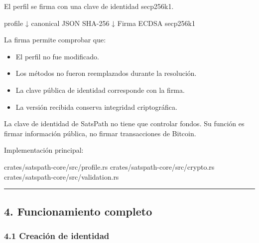 \documentclass[
]{article}
\newenvironment{Shaded}{}{}
\newcommand{\NormalTok}[1]{#1}
\providecommand{\tightlist}{%
  \setlength{\itemsep}{0pt}\setlength{\parskip}{0pt}}
\begin{document}
El perfil se firma con una clave de identidad secp256k1.

\begin{Shaded}
\begin{Highlighting}[]
\NormalTok{profile}
\NormalTok{    ↓ canonical JSON}
\NormalTok{SHA{-}256}
\NormalTok{    ↓}
\NormalTok{Firma ECDSA secp256k1}
\end{Highlighting}
\end{Shaded}

La firma permite comprobar que:

\begin{itemize}
\tightlist
\item
  El perfil no fue modificado.
\item
  Los métodos no fueron reemplazados durante la resolución.
\item
  La clave pública de identidad corresponde con la firma.
\item
  La versión recibida conserva integridad criptográfica.
\end{itemize}

La clave de identidad de SatsPath no tiene que controlar fondos. Su
función es firmar información pública, no firmar transacciones de
Bitcoin.

Implementación principal:

\begin{Shaded}
\begin{Highlighting}[]
\NormalTok{crates/satspath{-}core/src/profile.rs}
\NormalTok{crates/satspath{-}core/src/crypto.rs}
\NormalTok{crates/satspath{-}core/src/validation.rs}
\end{Highlighting}
\end{Shaded}

\begin{center}\rule{0.5\linewidth}{0.5pt}\end{center}

\hypertarget{funcionamiento-completo}{%
\subsection{4. Funcionamiento completo}\label{funcionamiento-completo}}

\hypertarget{creaciuxf3n-de-identidad}{%
\subsubsection{4.1 Creación de
identidad}\label{creaciuxf3n-de-identidad}}
\end{document}

